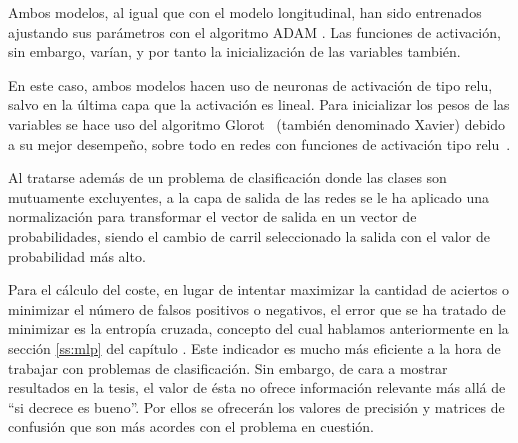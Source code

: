 Ambos modelos, al igual que con el modelo longitudinal, han sido entrenados ajustando sus parámetros con el algoritmo ADAM \cite{kingma2014adam}. Las funciones de activación, sin embargo, varían, y por tanto la inicialización de las variables también.

En este caso, ambos modelos hacen uso de neuronas de activación de tipo \acrshort{relu}, salvo en la última capa que la activación es lineal. Para inicializar los pesos de las variables se hace uso del algoritmo Glorot~\cite{glorot2010understanding} (también denominado Xavier) debido a su mejor desempeño, sobre todo en redes con funciones de activación tipo \acrshort{relu}~\cite{glorot2011deep}.

Al tratarse además de un problema de clasificación donde las clases son mutuamente excluyentes, a la capa de salida de las redes se le ha aplicado una normalización para transformar el vector de salida en un vector de probabilidades, siendo el cambio de carril seleccionado la salida con el valor de probabilidad más alto.

Para el cálculo del coste, en lugar de intentar maximizar la cantidad de aciertos o minimizar el número de falsos positivos o negativos, el error que se ha tratado de minimizar es la entropía cruzada, concepto del cual hablamos anteriormente en la sección \ref{ss:mlp} del capítulo . Este indicador es mucho más eficiente a la hora de trabajar con problemas de clasificación. Sin embargo, de cara a mostrar resultados en la tesis, el valor de ésta no ofrece información relevante más allá de \enquote{si decrece es bueno}. Por ellos se ofrecerán los valores de precisión y matrices de confusión que son más acordes con el problema en cuestión.

